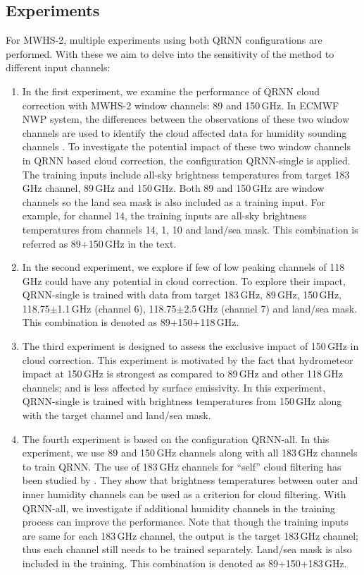 \documentclass[amt, manuscript]{copernicus}
\begin{document}
\subsection{Experiments}
%
\label{sec:QRNN_expt_MWHS}
For MWHS-2, multiple experiments using both QRNN configurations are performed. With these we aim to delve into the sensitivity of the method to different input channels:

\begin{enumerate}
	
	\item In the first experiment, we examine the performance of QRNN cloud correction with MWHS-2 window channels: 89 and 150\,GHz. In ECMWF NWP system, the differences between the observations of these two window channels are used to identify the cloud affected data for humidity sounding channels \citep{geer2015scatteringindex}. To investigate the potential impact of these two window channels in QRNN based cloud correction, the configuration QRNN-single is applied. The training inputs include all-sky brightness temperatures from target 183\,GHz channel, 89\,GHz and 150\,GHz. Both 89 and 150\,GHz are window channels so the land sea mask is also included as a training input. For example, for channel 14, the training inputs are all-sky brightness temperatures from channels 14, 1, 10 and land/sea mask. This combination is referred as 89+150\,GHz in the text.
	
	\item In the second experiment, we explore if few of low peaking channels of 118\,GHz could have any potential in cloud correction. To explore their impact, QRNN-single is trained with data from target 183\,GHz, 89\,GHz, 150\,GHz, 118.75$\pm$1.1\,GHz (channel 6), 118.75$\pm$2.5\,GHz (channel 7) and land/sea mask. This combination is denoted as 89+150+118\,GHz.
	
	\item The third experiment is designed to assess the exclusive impact of 150\,GHz in cloud correction. This experiment is motivated by the fact that hydrometeor impact at 150\,GHz is strongest as compared to 89\,GHz and other 118\,GHz channels; and is less affected by surface emissivity. In this experiment, QRNN-single is trained with brightness temperatures from 150\,GHz along with the target channel and land/sea mask. 
	
	\item The fourth experiment is based on the configuration QRNN-all. In this experiment, we use 89 and 150\,GHz channels along with all 183\,GHz channels to train QRNN. The use of 183\,GHz channels for ``self'' cloud filtering has been studied by  \citet{buehler:aclou:07}. They show that brightness temperatures between outer and inner humidity channels can be used as a criterion for cloud filtering. With QRNN-all, we investigate if additional humidity channels in the training process can improve the performance. Note that though the training inputs are same for each 183\,GHz channel, the output is the target 183\,GHz channel; thus each channel still needs to be trained separately. Land/sea mask is also included in the training. This combination is denoted as 89+150+183\,GHz.
\end{enumerate}
\end{document}
